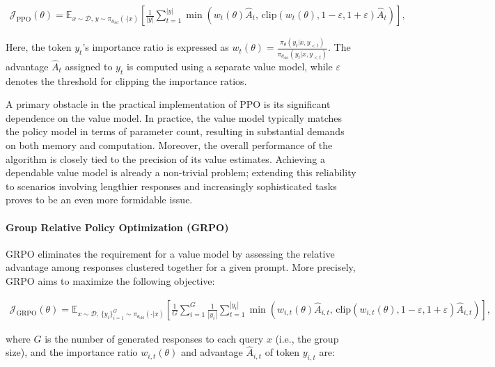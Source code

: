 \begin{align}
\mathcal{J}_\text{PPO}(\theta) = \mathbb{E}_{ x \sim \mathcal{D},\, y \sim \pi_{\theta_\text{old}}( \cdot | x) }
\left[ \frac{1}{|y|} \sum_{t=1}^{|y|} 
\min \left( w_{t}(\theta) \widehat{A}_{t},  \, \mathrm{clip} \left( w_{t}(\theta), 1 - {\varepsilon}, 1 + {\varepsilon}\right) \widehat{A}_{t} \right)
\right],
\end{align}

Here, the token $y_t$'s importance ratio is expressed as $ w_{t}(\theta) = \frac{ \pi_{\theta} (y_{t} | x, y_{<t}) }{ \pi_{\theta_\text{old}} (y_{t} | x,y_{<t})} $. The advantage $\widehat{A}_{t}$ assigned to $y_t$ is computed using a separate value model, while $\varepsilon$ denotes the threshold for clipping the importance ratios.

A primary obstacle in the practical implementation of PPO is its significant dependence on the value model. In practice, the value model typically matches the policy model in terms of parameter count, resulting in substantial demands on both memory and computation. Moreover, the overall performance of the algorithm is closely tied to the precision of its value estimates. Achieving a dependable value model is already a non-trivial problem; extending this reliability to scenarios involving lengthier responses and increasingly sophisticated tasks proves to be an even more formidable issue.

\paragraph{Group Relative Policy Optimization (GRPO)} GRPO \citep{grpo} eliminates the requirement for a value model by assessing the relative advantage among responses clustered together for a given prompt. More precisely, GRPO aims to maximize the following objective:

\begin{align}
\label{equ:grpo}
\mathcal{J}_\text{GRPO}(\theta) = \mathbb{E}_{ x \sim \mathcal{D},\, \{y_i\}_{i=1}^G \sim \pi_{\theta_\text{old}}( \cdot | x) }
\left[ \frac{1}{G} \sum_{i=1}^{G} \frac{1}{|y_i|} \sum_{t=1}^{|y_i|} 
\min \left( w_{i,t}(\theta) \widehat{A}_{i,t},  \, \mathrm{clip} \left( w_{i,t}(\theta), 1 - {\varepsilon}, 1 + {\varepsilon}\right) \widehat{A}_{i,t} \right)
\right],
\end{align}

where $G$ is the number of generated responses to each query $x$ (i.e., the group size), and the importance ratio $w_{i,t}(\theta)$ and advantage $\widehat{A}_{i,t}$ of token $y_{i,t}$ are:

